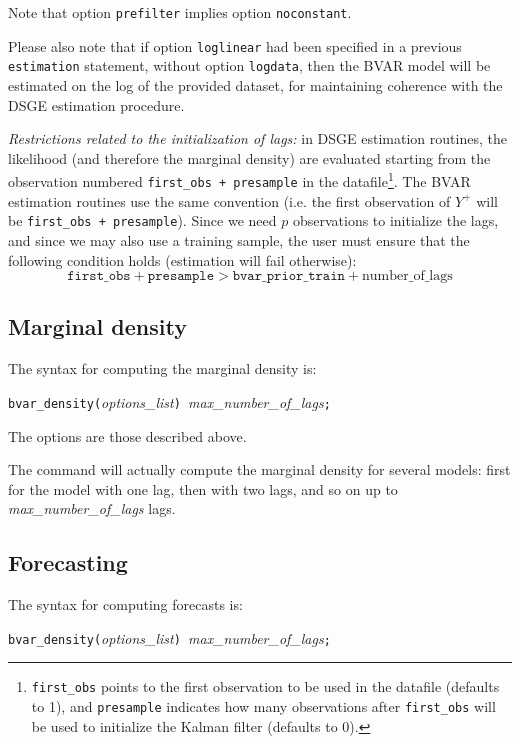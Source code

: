 \documentclass[10pt,a4paper]{article}
\begin{document}
Note that option \texttt{prefilter} implies option \texttt{noconstant}.

Please also note that if option \texttt{loglinear} had been specified in a previous \texttt{estimation} statement, without option \texttt{logdata}, then the BVAR model will be estimated on the log of the provided dataset, for maintaining coherence with the DSGE estimation procedure.

\emph{Restrictions related to the initialization of lags:} in DSGE estimation routines, the likelihood (and therefore the marginal density) are evaluated starting from the observation numbered \texttt{first\_obs + presample} in the datafile\footnote{\texttt{first\_obs} points to the first observation to be used in the datafile (defaults to 1), and \texttt{presample} indicates how many observations after \texttt{first\_obs} will be used to initialize the Kalman filter (defaults to 0).}. The BVAR estimation routines use the same convention (i.e. the first observation of $Y^+$ will be \texttt{first\_obs + presample}). Since we need $p$ observations to initialize the lags, and since we may also use a training sample, the user must ensure that the following condition holds (estimation will fail otherwise):
$$\texttt{first\_obs} + \texttt{presample} > \texttt{bvar\_prior\_train} + \text{number\_of\_lags}$$


\subsection{Marginal density}

The syntax for computing the marginal density is:

\medskip
\texttt{bvar\_density(}\textit{options\_list}\texttt{) }\textit{max\_number\_of\_lags}\texttt{;}
\medskip

The options are those described above.

The command will actually compute the marginal density for several models: first for the model with one lag, then with two lags, and so on up to \textit{max\_number\_of\_lags} lags.

\subsection{Forecasting}

The syntax for computing forecasts is:

\medskip
\texttt{bvar\_density(}\textit{options\_list}\texttt{) }\textit{max\_number\_of\_lags}\texttt{;}
\medskip
\end{document}
